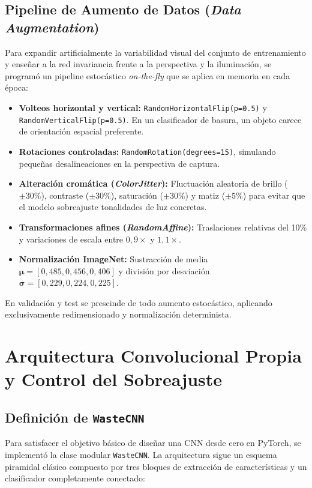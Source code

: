 \documentclass[11pt,a4paper]{article}
\begin{document}
\subsection{Pipeline de Aumento de Datos (\textit{Data Augmentation})}
Para expandir artificialmente la variabilidad visual del conjunto de entrenamiento y enseñar a la red invariancia frente a la perspectiva y la iluminación, se programó un pipeline estocástico \textit{on-the-fly} que se aplica en memoria en cada época:
\begin{itemize}[noitemsep]
    \item \textbf{Volteos horizontal y vertical:} \texttt{RandomHorizontalFlip(p=0.5)} y \texttt{RandomVerticalFlip(p=0.5)}. En un clasificador de basura, un objeto carece de orientación espacial preferente.
    \item \textbf{Rotaciones controladas:} \texttt{RandomRotation(degrees=15)}, simulando pequeñas desalineaciones en la perspectiva de captura.
    \item \textbf{Alteración cromática (\textit{ColorJitter}):} Fluctuación aleatoria de brillo ($\pm 30\%$), contraste ($\pm 30\%$), saturación ($\pm 30\%$) y matiz ($\pm 5\%$) para evitar que el modelo sobreajuste tonalidades de luz concretas.
    \item \textbf{Transformaciones afines (\textit{RandomAffine}):} Traslaciones relativas del 10\% y variaciones de escala entre $0,9\times$ y $1,1\times$.
    \item \textbf{Normalización ImageNet:} Sustracción de media $\boldsymbol{\mu} = [0,485, 0,456, 0,406]$ y división por desviación $\boldsymbol{\sigma} = [0,229, 0,224, 0,225]$.
\end{itemize}
En validación y test se prescinde de todo aumento estocástico, aplicando exclusivamente redimensionado y normalización determinista.

\section{Arquitectura Convolucional Propia y Control del Sobreajuste}

\subsection{Definición de \texttt{WasteCNN}}
Para satisfacer el objetivo básico de diseñar una CNN desde cero en PyTorch, se implementó la clase modular \texttt{WasteCNN}. La arquitectura sigue un esquema piramidal clásico compuesto por tres bloques de extracción de características y un clasificador completamente conectado:
\end{document}
